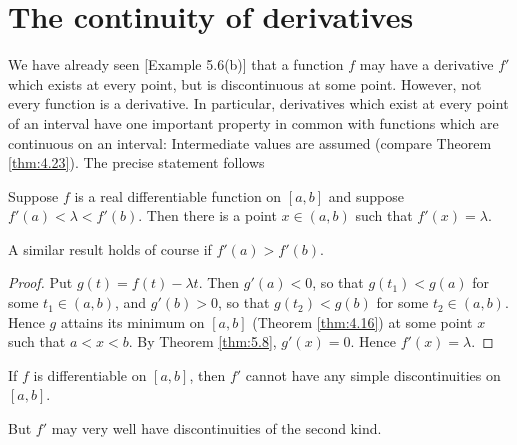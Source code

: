 \section{The continuity of derivatives}

We have already seen [Example 5.6(b)] that 
a function $f$ may have a derivative $f'$ which exists at every point, 
but is discontinuous at some point. 
However, not every function is a derivative. 
In particular, derivatives which exist at every point of an interval 
have one important property in common with functions
which are continuous on an interval:
Intermediate values are assumed (compare Theorem \ref{thm:4.23}). 
The precise statement follows

\begin{thm}
    \label{thm:5.12}
    Suppose $f$ is a real differentiable function on $[a, b]$ 
    and suppose $f'(a) < \lambda <f'(b)$. 
    Then there is a point $x \in (a, b)$ 
    such that $f'(x) = \lambda$.
\end{thm}
A similar result holds of course if $f'(a) > f'(b)$.
\begin{proof}
    Put $g(t) = f(t) - \lambda t$. 
    Then $g'(a) < 0$, so that $g(t_1) < g(a)$ for some $t_1 \in (a, b)$, 
    and  $g'(b) > 0$, so that $g(t_2) < g(b)$ for some $t_2 \in (a, b)$. 
    Hence $g$ attains its minimum on $[a, b]$ (Theorem \ref{thm:4.16}) at some point $x$ such that $a < x < b$. 
    By Theorem \ref{thm:5.8}, $g'(x) = 0$. 
    Hence $f'(x) = \lambda$.
\end{proof}

\begin{myCorollary*}
    If $f$ is differentiable on $[a, b]$, 
    then $f'$ cannot have any simple discontinuities on $[a, b]$.

    But $f'$ may very well have discontinuities of the second kind.
\end{myCorollary*}
